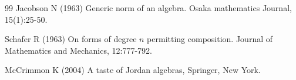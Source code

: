 \documentclass{amsart}
\theoremstyle{definition}
\numberwithin{theorem}{section}
\numberwithin{equation}{section}
\begin{document}
\begin{thebibliography}{99}
               Jacobson N  (1963) Generic norm of an algebra. Osaka mathematics Journal, 15(1):25-50.
  
          Schafer R (1963) On forms of degree $n$ permitting composition. Journal of Mathematics and Mechanics, 12:777-792.       
      
        McCrimmon K (2004) A taste of Jordan algebras, Springer, New York.
 
      \end{thebibliography}
       
 
\end{document}

